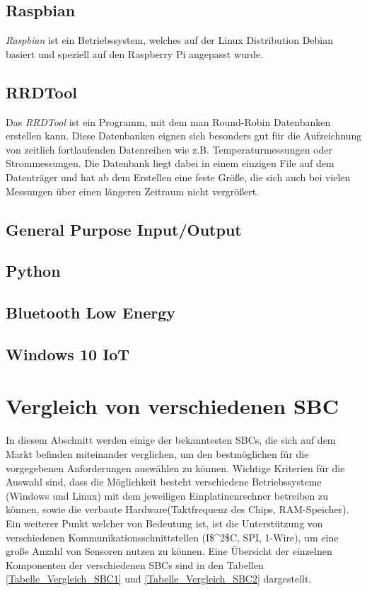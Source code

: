\subsection*{Raspbian}
\textit{Raspbian} ist ein Betriebssystem, welches auf der Linux Distribution Debian basiert und speziell auf den Raspberry Pi angepasst wurde.

\subsection*{RRDTool}
Das \textit{RRDTool} ist ein Programm, mit dem man Round-Robin Datenbanken erstellen kann. Diese Datenbanken eignen sich besonders gut für die Aufzeichnung von zeitlich fortlaufenden Datenreihen wie z.B. Temperaturmessungen oder Strommessungen. Die Datenbank liegt dabei in einem einzigen File auf dem Datenträger und hat ab dem Erstellen eine feste Größe, die sich auch bei vielen Messungen über einen längeren Zeitraum nicht vergrößert. 

\subsection*{General Purpose Input/Output}

\subsection*{Python}

\subsection*{Bluetooth Low Energy}

\subsection*{Windows 10 IoT}

\section{Vergleich von verschiedenen SBC}
\label{section_Vergleich_SBC}
In diesem Abschnitt werden einige der bekanntesten \acp{SBC}, die sich auf dem Markt befinden miteinander verglichen, um den bestmöglichen für die vorgegebenen Anforderungen auswählen zu können.
Wichtige Kriterien für die Auswahl sind, dass die Möglichkeit besteht verschiedene Betriebssysteme (Windows und Linux) mit dem jeweiligen Einplatinenrechner betreiben zu können, sowie die verbaute Hardware(Taktfrequenz des Chips, RAM-Speicher). Ein weiterer Punkt welcher von Bedeutung ist, ist die Unterstützung von verschiedenen Kommunikationsschnittstellen (\ac{I$^2$C}, \ac{SPI}, 1-Wire), um eine große Anzahl von Sensoren nutzen zu können. Eine Übersicht der einzelnen Komponenten der verschiedenen \acp{SBC} sind in den Tabellen \ref{Tabelle_Vergleich_SBC1} und \ref{Tabelle_Vergleich_SBC2} dargestellt.

